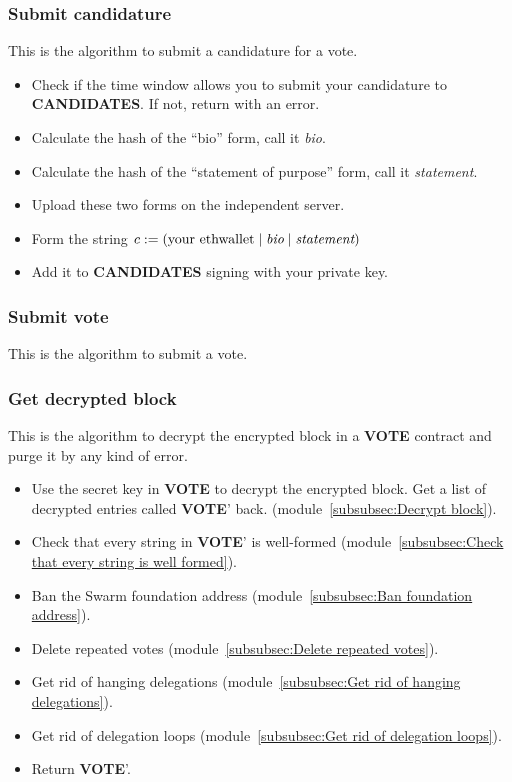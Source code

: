 \documentclass[submission, copyright,creativecommons,sharealike,noncommercial]{eptcs}
\newcommand{\Candidates}{\textbf{CANDIDATES}\xspace}
\newcommand{\Vote}{\textbf{VOTE}\xspace}
\begin{document}
\subsubsection{Submit candidature}\label{subsubsec:submit candidature}
	This is the algorithm to submit a candidature for a vote.
	\begin{itemize}
		\item Check if the time window allows you to submit your candidature to \Candidates. If not, return with an error.
		\item Calculate the hash of the ``bio'' form, call it \emph{bio}.
		\item Calculate the hash of the ``statement of purpose'' form, call it \emph{statement}.
		\item Upload these two forms on the independent server.
		\item Form the string $c:= (\text{your ethwallet} \mid \emph{bio} \mid \emph{statement})$
		\item Add it to \Candidates signing with your private key.	
	\end{itemize}

\subsubsection{Submit vote}\label{subsubsec:submit vote}
	This is the algorithm to submit a vote.

	
\subsubsection{Get decrypted block}\label{subsubsec:Get decrypted block}
	This is the algorithm to decrypt the encrypted block in a \Vote contract and purge it by any kind of error.
	\begin{itemize}
		\item Use the secret key in \Vote to decrypt the encrypted block. Get a list of decrypted entries called \Vote' back. (module~\ref{subsubsec:Decrypt block}).
		\item Check that every string in \Vote' is well-formed (module~\ref{subsubsec:Check that every string is well formed}).
		\item Ban the Swarm foundation address (module~\ref{subsubsec:Ban foundation address}).
		\item Delete repeated votes (module~\ref{subsubsec:Delete repeated votes}).
		\item Get rid of hanging delegations (module~\ref{subsubsec:Get rid of hanging delegations}).
		\item Get rid of delegation loops (module~\ref{subsubsec:Get rid of delegation loops}).
		\item Return \Vote'.
	\end{itemize}
\end{document}
